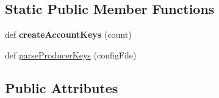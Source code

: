 \subsection*{Static Public Member Functions}
\begin{DoxyCompactItemize}
\item 
\mbox{\label{classtest_utils_1_1_cluster_a7f519749895a7f9a6ed8da1c5c0d5c18}} 
def {\bfseries create\+Account\+Keys} (count)
\item 
def \mbox{\hyperlink{classtest_utils_1_1_cluster_aa5a139808432b328d896efe8feb86e82}{parse\+Producer\+Keys}} (config\+File)
\end{DoxyCompactItemize}
\subsection*{Public Attributes}
